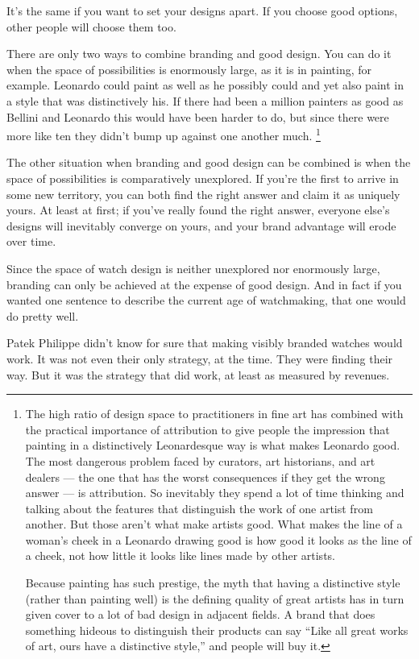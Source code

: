 It's the same if you want to set your designs apart. If you choose good
options, other people will choose them too.

There are only two ways to combine branding and good design. You can do
it when the space of possibilities is enormously large, as it is in
painting, for example. Leonardo could paint as well as he possibly could
and yet also paint in a style that was distinctively his. If there had
been a million painters as good as Bellini and Leonardo this would have
been harder to do, but since there were more like ten they didn't bump
up against one another much. \footnote{The high ratio of design space to practitioners in fine art has
combined with the practical importance of attribution to give people the
impression that painting in a distinctively Leonardesque way is what
makes Leonardo good. The most dangerous problem faced by curators, art
historians, and art dealers --- the one that has the worst consequences
if they get the wrong answer --- is attribution. So inevitably they
spend a lot of time thinking and talking about the features that
distinguish the work of one artist from another. But those aren't what
make artists good. What makes the line of a woman's cheek in a Leonardo
drawing good is how good it looks as the line of a cheek, not how little
it looks like lines made by other artists.

Because painting has such prestige, the myth that having a distinctive
style (rather than painting well) is the defining quality of great
artists has in turn given cover to a lot of bad design in adjacent
fields. A brand that does something hideous to distinguish their
products can say ``Like all great works of art, ours have a distinctive
style,'' and people will buy it.}

The other situation when branding and good design can be combined is
when the space of possibilities is comparatively unexplored. If you're
the first to arrive in some new territory, you can both find the right
answer and claim it as uniquely yours. At least at first; if you've
really found the right answer, everyone else's designs will inevitably
converge on yours, and your brand advantage will erode over time.

Since the space of watch design is neither unexplored nor enormously
large, branding can only be achieved at the expense of good design. And
in fact if you wanted one sentence to describe the current age of
watchmaking, that one would do pretty well.

Patek Philippe didn't know for sure that making visibly branded watches
would work. It was not even their only strategy, at the time. They were
finding their way. But it was the strategy that did work, at least as
measured by revenues.

